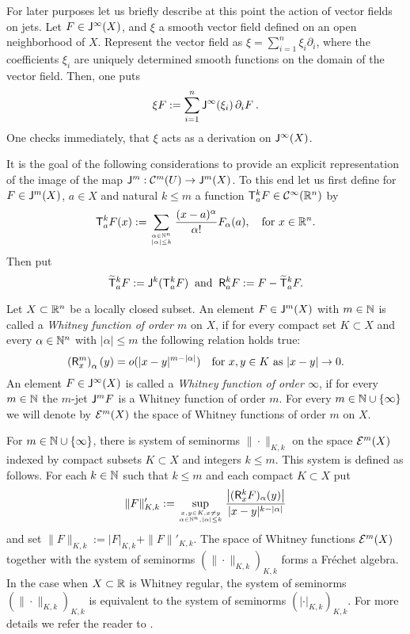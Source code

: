   For later purposes let us briefly describe at this point the action of vector fields on 
  jets. Let $F \in \mathsf{J}^\infty (X)$, and $\xi $ a smooth vector field defined 
  on an open neighborhood of $X$. Represent the vector field as $\xi = \sum_{i=1}^n \xi_i \partial_i$,
  where the coefficients $\xi_i$ are   uniquely 
  determined smooth functions on the domain of the vector field. Then, one puts
\[
   \xi F := \sum_{i=1}^n \mathsf{J}^\infty (\xi_i) \, \partial_iF \: . 
\]
One checks immediately, that $\xi$ acts as a derivation on $\mathsf{J}^\infty (X)$.

  It is the goal of the following considerations to provide an
  explicit representation of the image of the map 
  $\mathsf{J}^m : \mathcal{C}^m (U) \rightarrow \mathsf{J}^m (X)$. To this end let us first define for 
  $F \in \mathsf{J}^m (X)$, $a\in X$ and natural $k\leq m$ a function 
  $\mathsf{T}_a^k F \in \mathcal{C}^\infty (\mathbb{R}^n)$ by
  \[
     \mathsf{T}_a^k F (x) := \sum_{\alpha \in \mathbb{N}^n \atop | \alpha | \leq k}
     \frac{(x-a)^\alpha}{\alpha !} F_\alpha (a), \quad \text{for $x\in \mathbb{R}^n$}.
  \]
  Then put
  \[
    \widetilde{\mathsf{T}}_a^k F := \mathsf{J}^k (\mathsf{T}_a^k F) \: \text{ and } \:
    \mathsf{R}_a^k F := F -  \widetilde{\mathsf{T}}_a^k F .
  \]
  \begin{definition}
    Let $X\subset \mathbb{R}^n$ be a locally closed subset. An element $F \in \mathsf{J}^m (X)$
    with $m\in \mathbb{N}$ is called a \textit{Whitney function of order $m$} 
    on $X$, if for every compact set $K\subset X$ and every $\alpha \in \mathbb{N}^n$ 
    with $| \alpha | \leq m$ the following relation holds true:
    \[
      \left( \mathsf{R}^m_x \right)_\alpha (y) = o ( | x-y|^{m-|\alpha|}) \quad 
      \text{for $x,y\in K$ as $|x-y| \rightarrow 0$}. 
    \]
    An element $F \in \mathsf{J}^\infty (X)$
    is called a \textit{Whitney function of order $\infty$}, if for every $m\in \mathbb{N}$
    the $m$-jet $\mathsf{J}^m F$ is a Whitney function of order $m$.
    For every $m\in \mathbb{N} \cup \{ \infty \} $ we will denote by $\mathcal{E}^m (X) $ 
    the space of Whitney functions of order $m$ on $X$.
  \end{definition}
 
For  $m\in \mathbb{N} \cup \{ \infty \}$,  there is system of seminorms $\|\cdot \|_{K,k}$ on the space  
$\mathcal{E}^m (X)$ indexed by compact subsets  $K\subset X$ and integers $k\le m$. This system is
defined as follows. For each $k\in\mathbb{N}$ such that $k\le m$ and each compact $K\subset X$ put
\begin{align*}
\| F \|'_{K,k}:=\sup_{x,y\in K, x\ne y\atop \alpha\in \mathbb{N}^n,|\alpha|\le k}{\left|(\mathsf{R}^k_x F)_\alpha(y)\right|\over|x-y|^{k-|\alpha|}}
\end{align*} 
and set $\| F \|_{K,k}:= |F |_{K,k}+\| F \|'_{K,k}$. The space of Whitney functions  $\mathcal{E}^m (X)$ together 
with the system of seminorms $(\| \cdot \|_{K,k})_{K,k}$ forms a  Fr\'echet algebra. In the case when 
$X\subset \mathbb{R}$ is Whitney regular, the system of seminorms 
$(\| \cdot \|_{K,k})_{K,k}$ is equivalent to the system of seminorms $(| \cdot |_{K,k})_{K,k}$. For more 
details we refer the reader to \cite[Prop.~2.6 \& Prop.~3.11]{TouIFD}.

